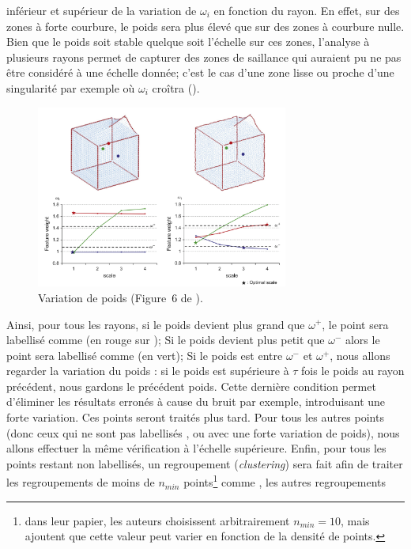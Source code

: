 inférieur et supérieur de la variation de $\omega_i$ en fonction du rayon. En
effet, sur des zones à forte courbure, le poids sera plus élevé que sur des
zones à courbure nulle. Bien que le poids soit stable quelque soit l'échelle sur
ces zones, l'analyse à plusieurs rayons permet de capturer des zones de
saillance qui auraient pu ne pas être considéré à une échelle donnée; c'est le
cas d'une zone lisse ou proche d'une singularité par exemple où $\omega_i$ croîtra
().
%
\begin{figure}[ht]{
    \begin{center}
    \includegraphics[height=6cm]{images/Feature/Tensor_weight}
    \end{center}}
    \caption[Variation de poids.]{Variation de poids (Figure~6 de \cite{Park2012}).
      \label{fig:tensor-weight}}
\end{figure}
%
Ainsi, pour tous les rayons, si le poids devient plus grand que $\omega^+$, le
point sera labellisé comme \Feature (en rouge sur
); Si le poids devient plus petit que
$\omega^-$ alors le point sera labellisé comme \NonFeature (en vert); Si le
poids est entre $\omega^-$ et $\omega^+$, nous allons regarder la variation du
poids : si le poids est supérieure à $\tau$ fois le poids au rayon précédent,
nous gardons le précédent poids. Cette dernière condition permet d'éliminer les
résultats erronés à cause du bruit par exemple, introduisant une forte
variation. Ces points seront traités plus tard. Pour tous les autres points
(donc ceux qui ne sont pas labellisés \Feature, \NonFeature ou avec une forte
variation de poids), nous allons effectuer la même vérification à l'échelle
supérieure. Enfin, pour tous les points restant non labellisés, un regroupement
(\emph{clustering}) sera fait afin de traiter les regroupements de moins de
$n_{min}$ points\footnote{dans leur papier, les auteurs choisissent
arbitrairement $n_{min}=10$, mais ajoutent que cette valeur peut varier en
fonction de la densité de points.} comme \NonFeature, les autres regroupements
